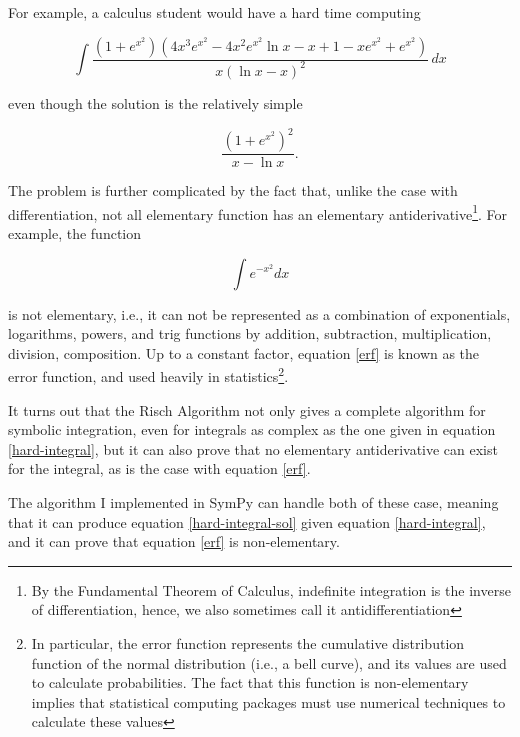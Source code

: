 \documentclass[12pt]{article}
\begin{document}
For example, a calculus student would have a hard time computing

\begin{equation}
\label{hard-integral}
\int{
    \frac{\left( 1 + e^{x^2} \right)
        \left(4x^3e^{x^2} - 4x^2e^{x^2}\ln{x} - x + 1 - xe^{x^2} + e^{x^2}\right)}
    {x\left(\ln{x} - x\right)^2}\,dx}
\end{equation}

even though the solution is the relatively simple 

\begin{equation}
\label{hard-integral-sol}
\frac{\left(1 + e^{x^{2}}\right)^{2}}{x - \ln{x}}.
\end{equation}

The problem is further complicated by the fact that, unlike the case
with differentiation, not all elementary function has an elementary
antiderivative\footnote{By the Fundamental Theorem of Calculus,
indefinite integration is the inverse of differentiation, hence, we also
sometimes call it antidifferentiation}.  For example, the function

\begin{equation}
\label{erf}
\int{e^{-x^2}dx}
\end{equation}

is not elementary, i.e., it can not be represented as a combination of
exponentials, logarithms, powers, and trig functions by addition,
subtraction, multiplication, division, composition.  Up to a constant
factor, equation \ref{erf} is known as the error function, and used
heavily in statistics\footnote{In particular, the error function
represents the cumulative distribution function of the normal
distribution (i.e., a bell curve), and its values are used to calculate
probabilities.  The fact that this function is non-elementary implies
that statistical computing packages must use numerical techniques to
calculate these values}.

It turns out that the Risch Algorithm not only gives a complete
algorithm for symbolic integration, even for integrals as complex as the
one given in equation \ref{hard-integral}, but it can also prove that no
elementary antiderivative can exist for the integral, as is the case
with equation \ref{erf}.

The algorithm I implemented in Sym\-Py can handle both of these case,
meaning that it can produce equation \ref{hard-integral-sol} given
equation \ref{hard-integral}, and it can prove that equation \ref{erf}
is non-elementary.
\end{document}
